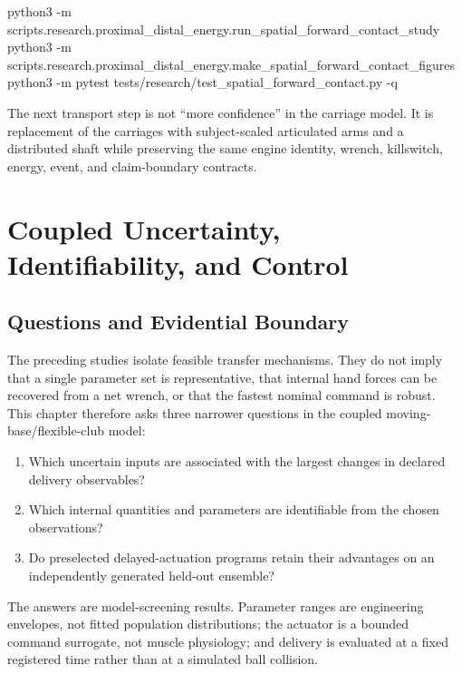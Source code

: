 \documentclass[
  letterpaper,
]{report}
\newenvironment{Shaded}{\begin{snugshade}}{\end{snugshade}}
\newcommand{\AttributeTok}[1]{\textcolor[rgb]{0.40,0.45,0.13}{#1}}
\newcommand{\ExtensionTok}[1]{\textcolor[rgb]{0.00,0.23,0.31}{#1}}
\newcommand{\NormalTok}[1]{\textcolor[rgb]{0.00,0.23,0.31}{#1}}
\providecommand{\tightlist}{%
  \setlength{\itemsep}{0pt}\setlength{\parskip}{0pt}}
\begin{document}
\begin{Shaded}
\begin{Highlighting}[]
\ExtensionTok{python3} \AttributeTok{{-}m}\NormalTok{ scripts.research.proximal\_distal\_energy.run\_spatial\_forward\_contact\_study}
\ExtensionTok{python3} \AttributeTok{{-}m}\NormalTok{ scripts.research.proximal\_distal\_energy.make\_spatial\_forward\_contact\_figures}
\ExtensionTok{python3} \AttributeTok{{-}m}\NormalTok{ pytest tests/research/test\_spatial\_forward\_contact.py }\AttributeTok{{-}q}
\end{Highlighting}
\end{Shaded}

The next transport step is not ``more confidence'' in the carriage
model. It is replacement of the carriages with subject-scaled
articulated arms and a distributed shaft while preserving the same
engine identity, wrench, killswitch, energy, event, and claim-boundary
contracts.

\chapter{Coupled Uncertainty, Identifiability, and
Control}\label{sec-uncertainty-control}

\section{Questions and Evidential
Boundary}\label{questions-and-evidential-boundary}

The preceding studies isolate feasible transfer mechanisms. They do not
imply that a single parameter set is representative, that internal hand
forces can be recovered from a net wrench, or that the fastest nominal
command is robust. This chapter therefore asks three narrower questions
in the coupled moving-base/flexible-club model:

\begin{enumerate}
\def\labelenumi{\arabic{enumi}.}
\tightlist
\item
  Which uncertain inputs are associated with the largest changes in
  declared delivery observables?
\item
  Which internal quantities and parameters are identifiable from the
  chosen observations?
\item
  Do preselected delayed-actuation programs retain their advantages on
  an independently generated held-out ensemble?
\end{enumerate}

The answers are model-screening results. Parameter ranges are
engineering envelopes, not fitted population distributions; the actuator
is a bounded command surrogate, not muscle physiology; and delivery is
evaluated at a fixed registered time rather than at a simulated ball
collision.
\end{document}

